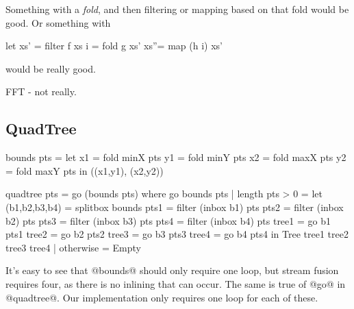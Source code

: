 Something with a \emph{fold}, and then filtering or mapping based on that fold would be good.
Or something with
\begin{code}
let xs' = filter f    xs
    i   = fold   g    xs'
    xs''= map   (h i) xs'
\end{code}
would be really good.

FFT - not really.

\subsection{QuadTree}
\begin{code}
bounds pts
 = let x1 = fold minX pts
       y1 = fold minY pts
       x2 = fold maxX pts
       y2 = fold maxY pts
   in ((x1,y1), (x2,y2))

%
quadtree pts
 = go (bounds pts)
 where
  go bounds pts
   | length pts > 0
   = let (b1,b2,b3,b4) = splitbox bounds
         pts1  = filter (inbox b1) pts
         pts2  = filter (inbox b2) pts
         pts3  = filter (inbox b3) pts
         pts4  = filter (inbox b4) pts
         tree1 = go b1 pts1
         tree2 = go b2 pts2
         tree3 = go b3 pts3
         tree4 = go b4 pts4
      in Tree tree1 tree2 tree3 tree4
   | otherwise
   = Empty
\end{code}
It's easy to see that @bounds@ should only require one loop, but stream fusion requires four, as there is no inlining that can occur.
The same is true of @go@ in @quadtree@. Our implementation only requires one loop for each of these.
